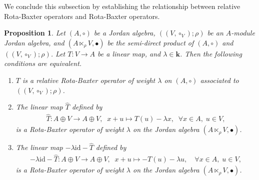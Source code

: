 \documentclass[12pt, reqno, a4paper]{amsart}
\newtheorem{proposition}[theorem]{Proposition}
\theoremstyle{definition}
\newcommand{\id}{\mathrm{id}}
\begin{document}
We conclude this subsection by establishing the relationship between relative Rota-Baxter operators and Rota-Baxter operators.


\begin{proposition}
	Let $(A, \circ)$ be a Jordan algebra, $((V, \circ_V); \rho)$ be an $A$-module Jordan algebra, and $(A \ltimes_{\rho}V, \bullet)$ be the semi-direct product of $(A, \circ)$ and $((V, \circ_V); \rho)$.
	Let $T: V \to A$ be a linear map, and $\lambda \in \mathbf{k}$.
	Then the following conditions are equivalent.
	\begin{enumerate}[label=(\roman*)]
		\item \label{xyzw:semi:1}
		      $T$ is a relative Rota-Baxter operator of weight $\lambda$ on $(A, \circ)$ associated to $((V, \circ_V); \rho)$.

		\item \label{xyzw:semi:2}
		      The linear map $\widehat{T}$ defined by
		      \begin{align}
			      \widehat{T}: A \oplus V \to A \oplus V, \;\; x + u \mapsto T(u) - \lambda x, \;\; \forall x \in A,\; u \in V,
		      \end{align}
		      is a Rota-Baxter operator of weight $\lambda$ on the Jordan algebra $(A \ltimes_{\rho}V, \bullet)$.

		\item \label{xyzw:semi:3}
		      The linear map $-\lambda \id - \widehat{T}$ defined by
		      \begin{align}
			      -\lambda \id - \widehat{T}: A \oplus V \to A \oplus V , \;\; x + u \mapsto -  T(u)-\lambda u, \quad \forall x \in A,\; u \in V,
		      \end{align}
		      is a Rota-Baxter operator of weight $\lambda$ on the Jordan algebra $(A \ltimes_{\rho}V, \bullet)$.
	\end{enumerate}
\end{proposition}
\end{document}
